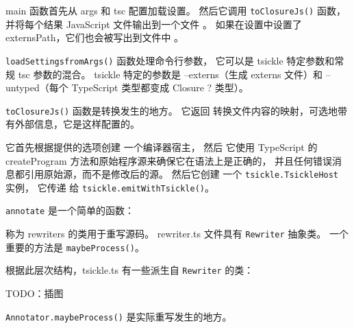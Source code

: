 main 函数首先从 args  和 tsc  配置加载设置。
然后它调用 \texttt{toClosureJs()}  函数，
并将每个结果 JavaScript 文件输出到一个文件 。
如果在设置中设置了 externsPath，它们也会被写出到文件中 。


\texttt{loadSettingsfromArgs()} 函数处理命令行参数，
它可以是 tsickle 特定参数和常规 tsc 参数的混合。
tsickle 特定的参数是 –externs（生成 externs 文件）和
–untyped（每个 TypeScript 类型都变成 Closure {?} 类型）。


\texttt{toClosureJs()} 函数是转换发生的地方。
它返回  转换文件内容的映射，可选地带有外部信息，它是这样配置的。




它首先根据提供的选项创建  一个编译器宿主，
然后  它使用 TypeScript 的 createProgram 方法和原始程序源来确保它在语法上是正确的，
并且任何错误消息都引用原始源，而不是修改后的源。
然后它创建  一个 \texttt{tsickle.TsickleHost} 实例，
它传递  给 \texttt{tsickle.emitWithTsickle()}。


\texttt{annotate} 是一个简单的函数：




称为 rewriters 的类用于重写源码。
rewriter.ts 文件具有 \texttt{Rewriter} 抽象类。
一个重要的方法是 \texttt{maybeProcess()}。




根据此层次结构，tsickle.ts 有一些派生自 \texttt{Rewriter} 的类：

TODO：插图


\texttt{Annotator.maybeProcess()} 是实际重写发生的地方。
